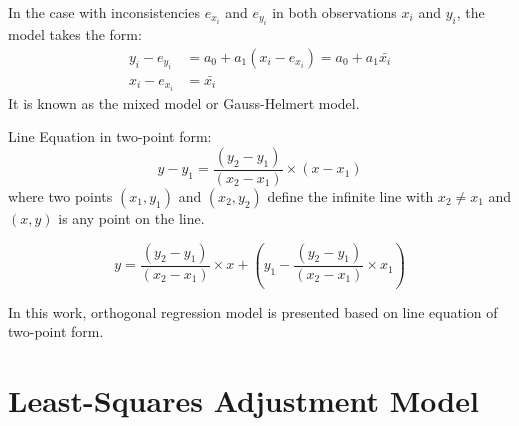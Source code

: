 In the case with inconsistencies $e_{x_i}$ and $e_{y_i}$ in both observations $x_i$ and $y_i$, the model takes the form:
\begin{equation} %
\begin{split}
y_i - e_{y_i} &= a_0 + a_1(x_i-e_{x_i}) = a_0 + a_1\bar{x_i}\\
x_i-e_{x_i} &= \bar{x_i}
\end{split}
\end{equation}
It is known as the mixed model or Gauss-Helmert model.

Line Equation in two-point form:
\begin{equation} %
y-y_1 = \dfrac{(y_2-y_1)}{(x_2-x_1)}\times(x-x_1)
\end{equation}
where two points $(x_1,y_1)$ and $(x_2,y_2)$ define the infinite line with $x_2\neq x_1$ and $(x,y)$ is any point on the line.





\begin{equation} %
y = \dfrac{(y_2-y_1)}{(x_2-x_1)}\times x+(y_1-\dfrac{(y_2-y_1)}{(x_2-x_1)}\times x_1)
\end{equation}



In this work, orthogonal regression model is presented based on line equation of two-point form.





\section{Least-Squares Adjustment Model}
\label{sec:2.4}







